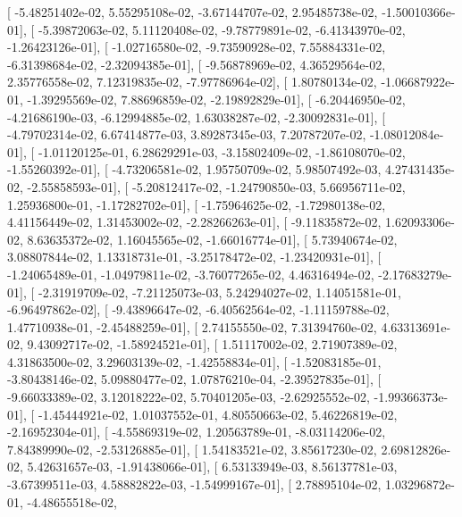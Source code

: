 \documentclass{article}
\begin{document}
       [ -5.48251402e-02,   5.55295108e-02,  -3.67144707e-02,
          2.95485738e-02,  -1.50010366e-01],
       [ -5.39872063e-02,   5.11120408e-02,  -9.78779891e-02,
         -6.41343970e-02,  -1.26423126e-01],
       [ -1.02716580e-02,  -9.73590928e-02,   7.55884331e-02,
         -6.31398684e-02,  -2.32094385e-01],
       [ -9.56878969e-02,   4.36529564e-02,   2.35776558e-02,
          7.12319835e-02,  -7.97786964e-02],
       [  1.80780134e-02,  -1.06687922e-01,  -1.39295569e-02,
          7.88696859e-02,  -2.19892829e-01],
       [ -6.20446950e-02,  -4.21686190e-03,  -6.12994885e-02,
          1.63038287e-02,  -2.30092831e-01],
       [ -4.79702314e-02,   6.67414877e-03,   3.89287345e-03,
          7.20787207e-02,  -1.08012084e-01],
       [ -1.01120125e-01,   6.28629291e-03,  -3.15802409e-02,
         -1.86108070e-02,  -1.55260392e-01],
       [ -4.73206581e-02,   1.95750709e-02,   5.98507492e-03,
          4.27431435e-02,  -2.55858593e-01],
       [ -5.20812417e-02,  -1.24790850e-03,   5.66956711e-02,
          1.25936800e-01,  -1.17282702e-01],
       [ -1.75964625e-02,  -1.72980138e-02,   4.41156449e-02,
          1.31453002e-02,  -2.28266263e-01],
       [ -9.11835872e-02,   1.62093306e-02,   8.63635372e-02,
          1.16045565e-02,  -1.66016774e-01],
       [  5.73940674e-02,   3.08807844e-02,   1.13318731e-01,
         -3.25178472e-02,  -1.23420931e-01],
       [ -1.24065489e-01,  -1.04979811e-02,  -3.76077265e-02,
          4.46316494e-02,  -2.17683279e-01],
       [ -2.31919709e-02,  -7.21125073e-03,   5.24294027e-02,
          1.14051581e-01,  -6.96497862e-02],
       [ -9.43896647e-02,  -6.40562564e-02,  -1.11159788e-02,
          1.47710938e-01,  -2.45488259e-01],
       [  2.74155550e-02,   7.31394760e-02,   4.63313691e-02,
          9.43092717e-02,  -1.58924521e-01],
       [  1.51117002e-02,   2.71907389e-02,   4.31863500e-02,
          3.29603139e-02,  -1.42558834e-01],
       [ -1.52083185e-01,  -3.80438146e-02,   5.09880477e-02,
          1.07876210e-04,  -2.39527835e-01],
       [ -9.66033389e-02,   3.12018222e-02,   5.70401205e-03,
         -2.62925552e-02,  -1.99366373e-01],
       [ -1.45444921e-02,   1.01037552e-01,   4.80550663e-02,
          5.46226819e-02,  -2.16952304e-01],
       [ -4.55869319e-02,   1.20563789e-01,  -8.03114206e-02,
          7.84389990e-02,  -2.53126885e-01],
       [  1.54183521e-02,   3.85617230e-02,   2.69812826e-02,
          5.42631657e-03,  -1.91438066e-01],
       [  6.53133949e-03,   8.56137781e-03,  -3.67399511e-03,
          4.58882822e-03,  -1.54999167e-01],
       [  2.78895104e-02,   1.03296872e-01,  -4.48655518e-02,
\end{document}
